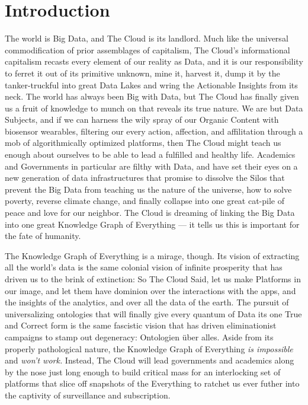 

\hypertarget{introduction}{%
\section{Introduction}\label{introduction}}

The world is Big Data, and The Cloud is its landlord. Much like the
universal commodification of prior \cite{warkCapitalDeadThis2021}  assemblages of capitalism, The Cloud's informational capitalism
recasts every element of our reality as Data, and it is our
responsibility to ferret it out of its primitive unknown, mine it,
harvest it, dump it by the tanker-truckful into great Data Lakes and
wring the Actionable Insights from its neck. The world has always been
Big with Data, but The Cloud has finally given us a fruit of knowledge
to munch on that reveals its true nature. We are but Data Subjects, and
if we can harness the wily spray of our Organic Content with biosensor
wearables, filtering our every action, affection, and affilitation
through a mob of algorithmically optimized platforms, then The Cloud
might teach us enough about ourselves to be able to lead a fulfilled and
healthy life. Academics and Governments in particular are filthy with
Data, and have set their eyes on a new generation of data
infrastructures that promise to dissolve the Silos that prevent the Big
Data from teaching us the nature of the universe, how to solve poverty,
reverse climate change, and finally collapse into one great cat-pile of
peace and love for our neighbor. The Cloud is dreaming of linking the
Big Data into one great Knowledge Graph of Everything --- it tells us
this is important for the fate of humanity.

The Knowledge Graph of Everything is a mirage, though. Its vision of
extracting all the world's data is the same colonial vision of infinite
prosperity that has driven us to the brink of extinction: So The Cloud
Said, let us make Platforms in our image, and let them have dominion
over the interactions with the apps, and the insights of the analytics,
and over all the data of the earth. The pursuit of universalizing
ontologies that will finally give every quantum of Data its one True and
Correct form is the same fascistic vision that has driven eliminationist
campaigns to stamp out degeneracy: Ontologien über alles. Aside from its
properly pathological nature, the Knowledge Graph of Everything \emph{is
impossible} and \emph{won't work.} Instead, The Cloud will lead
governments and academics along by the nose just long enough to build
critical mass for an interlocking set of platforms that slice off
snapshots of the Everything to ratchet us ever futher into the captivity
of surveillance and subscription.

